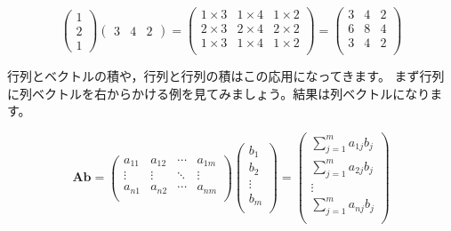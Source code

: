\documentclass{ltjsbook}
\begin{document}
\begin{equation*}
    \begin{pmatrix}
        1 \\2\\1
    \end{pmatrix}
    \begin{pmatrix}
        3 & 4 & 2
    \end{pmatrix}
    =
    \begin{pmatrix}
        1 \times 3 & 1 \times 4 & 1 \times 2 \\
        2 \times 3 & 2 \times 4 & 2 \times 2 \\
        1 \times 3 & 1 \times 4 & 1 \times 2 \\
    \end{pmatrix}
    =
    \begin{pmatrix}
        3 & 4 & 2 \\
        6 & 8 & 4 \\
        3 & 4 & 2 \\
    \end{pmatrix}
\end{equation*}



行列とベクトルの積や，行列と行列の積はこの応用になってきます。
まず行列に列ベクトルを右からかける例を見てみましょう。結果は列ベクトルになります。

\begin{equation*}
    \bm{A} \bm{b} =
    \begin{pmatrix}
        a_{11} & a_{12} & \cdots & a_{1m} \\
        \vdots & \vdots & \ddots & \vdots \\
        a_{n1} & a_{n2} & \cdots & a_{nm} \\
    \end{pmatrix}
    \begin{pmatrix}
        b_1    \\
        b_2    \\
        \vdots \\
        b_m    \\
    \end{pmatrix}
    =
    \begin{pmatrix}
        \sum_{j=1}^{m} a_{1j}b_{j} \\
        \sum_{j=1}^{m} a_{2j}b_{j} \\
        \vdots                     \\
        \sum_{j=1}^{m} a_{nj}b_{j} \\
    \end{pmatrix}
\end{equation*}
\end{document}
